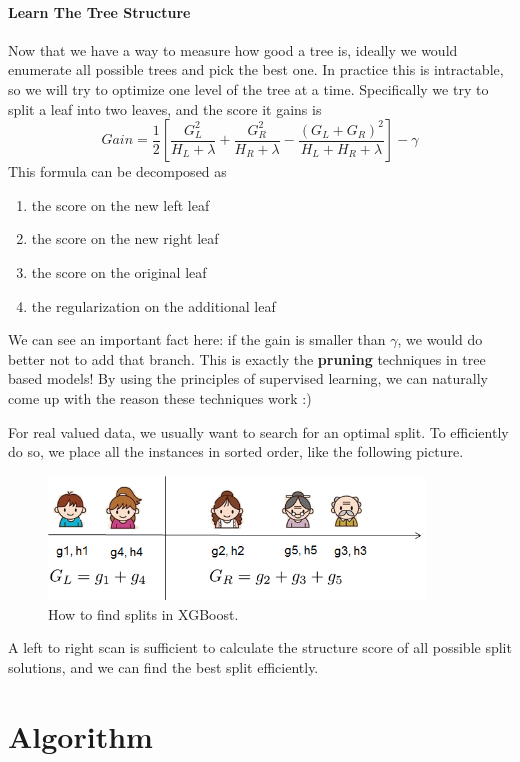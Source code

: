 \documentclass[a4paper, 12pt]{book} %
\begin{document}
\subsection{Learn The Tree Structure}
Now that we have a way to measure how good a tree is, ideally we would enumerate all possible trees and pick the best one. In practice this is intractable, so we will try to optimize one level of the tree at a time. Specifically we try to split a leaf into two leaves, and the score it gains is
\begin{equation}
Gain = \frac{1}{2} \left[\frac{G_L^2}{H_L+\lambda}+\frac{G_R^2}{H_R+\lambda}-\frac{(G_L+G_R)^2}{H_L+H_R+\lambda}\right] - \gamma
\end{equation}
This formula can be decomposed as 
\begin{enumerate}
	\item the score on the new left leaf
	\item the score on the new right leaf
	\item the score on the original leaf
	\item the regularization on the additional leaf
\end{enumerate}
We can see an important fact here: if the gain is smaller than $\gamma$, we would do better not to add that branch. This is exactly the \textbf{pruning} techniques in tree based models! By using the principles of supervised learning, we can naturally come up with the reason these techniques work :)

For real valued data, we usually want to search for an optimal split. To efficiently do so, we place all the instances in sorted order, like the following picture.
\begin{figure}[htpb]
	\centering
	\includegraphics[width=10cm]{figures/split_find.png}
	\caption{How to find splits in XGBoost.}
	\label{fig:boat1}
\end{figure}
A left to right scan is sufficient to calculate the structure score of all possible split solutions, and we can find the best split efficiently.


\part{Algorithm}
\end{document}

